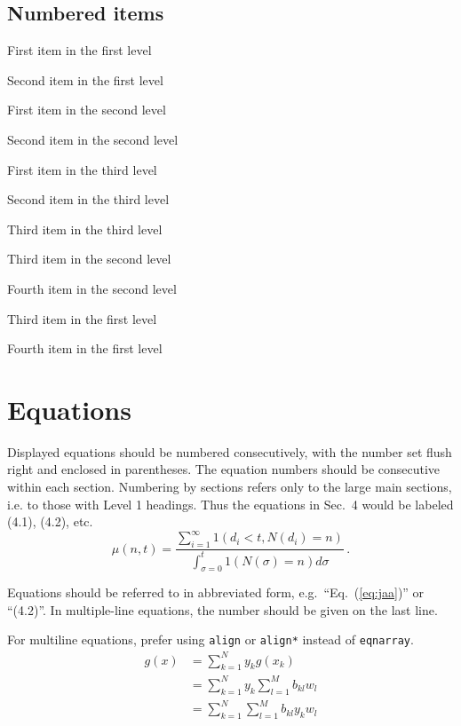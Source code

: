 \documentclass{ws-ijtaf}
\begin{document}
\subsection*{Numbered items}

\begin{arabiclist}
\item First item in the first level
\item Second item in the first level
\begin{alphlist}[(a)]
\item First item in the second level
\item Second item in the second level
\begin{romanlist}[iii.]
\item First item in the third level
\item Second item in the third level
\item Third item in the third level
\end{romanlist}
\item Third item in the second level
\item Fourth item in the second level
\end{alphlist}
\item Third item in the first level
\item Fourth item in the first level
\end{arabiclist}

\section{Equations}
Displayed equations should be numbered consecutively, with the number
set flush right and enclosed in parentheses. The equation numbers
should be consecutive within each section.  Numbering by sections
refers only to the large main sections, i.e. to those with Level 1
headings. Thus the equations in Sec.~4 would be labeled (4.1),
(4.2), etc.
\begin{equation}
\mu(n, t) = \frac{\sum^\infty_{i=1} 1(d_i < t, N(d_i)
= n)}{\int^t_{\sigma=0} 1(N(\sigma) = n)d\sigma}\,.
\label{eq:jaa}
\end{equation}

Equations should be referred to in abbreviated form,
e.g.~``Eq.~(\ref{eq:jaa})'' or ``(4.2)''. In multiple-line equations,
the number should be given on the last line.

For multiline equations, prefer using \verb|align| or \verb|align*| instead of \verb|eqnarray|.
\begin{align}
g(x) & = \sum_{k=1}^{N} y_k g(x_k) \nonumber\\
& = \sum_{k=1}^{N} y_k \sum_{l=1}^{M} b_{kl} w_l \nonumber\\
& = \sum_{k=1}^{N} \sum_{l=1}^{M} b_{kl} y_k w_l
\end{align}
\end{document}
